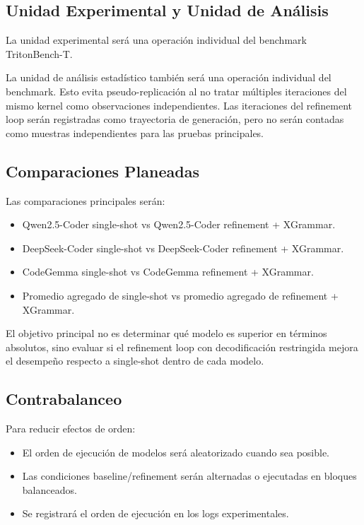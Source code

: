 \documentclass[12pt]{article}
\begin{document}
\subsection{Unidad Experimental y Unidad de Análisis}

La unidad experimental será una operación individual del benchmark TritonBench-T.

La unidad de análisis estadístico también será una operación individual del benchmark. Esto evita pseudo-replicación al no tratar múltiples iteraciones del mismo kernel como observaciones independientes. Las iteraciones del refinement loop serán registradas como trayectoria de generación, pero no serán contadas como muestras independientes para las pruebas principales.

\subsection{Comparaciones Planeadas}

Las comparaciones principales serán:

\begin{itemize}
    \item Qwen2.5-Coder single-shot vs Qwen2.5-Coder refinement + XGrammar.
    \item DeepSeek-Coder single-shot vs DeepSeek-Coder refinement + XGrammar.
    \item CodeGemma single-shot vs CodeGemma refinement + XGrammar.
    \item Promedio agregado de single-shot vs promedio agregado de refinement + XGrammar.
\end{itemize}

El objetivo principal no es determinar qué modelo es superior en términos absolutos, sino evaluar si el refinement loop con decodificación restringida mejora el desempeño respecto a single-shot dentro de cada modelo.

\subsection{Contrabalanceo}

Para reducir efectos de orden:

\begin{itemize}
    \item El orden de ejecución de modelos será aleatorizado cuando sea posible.
    \item Las condiciones baseline/refinement serán alternadas o ejecutadas en bloques balanceados.
    \item Se registrará el orden de ejecución en los logs experimentales.
\end{itemize}
\end{document}
